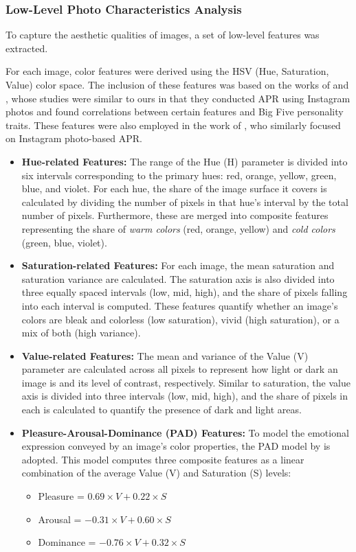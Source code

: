 \subsubsection{Low-Level Photo Characteristics Analysis}
To capture the aesthetic qualities of images, a set of low-level features was extracted.

For each image, color features were derived using the HSV (Hue, Saturation, Value) color space. The inclusion of these features was based on the works of \citet{ferwerda2016} and \citet{Ferwerda2018}, whose studies were similar to ours in that they conducted APR using Instagram photos and found correlations between certain features and Big Five personality traits. These features were also employed in the work of \citet{Branz2020}, who similarly focused on Instagram photo-based APR. 

\begin{itemize} 
	\item \textbf{Hue-related Features:} The range of the Hue (H) parameter is divided into six intervals corresponding to the primary hues: red, orange, yellow, green, blue, and violet. For each hue, the share of the image surface it covers is calculated by dividing the number of pixels in that hue's interval by the total number of pixels. Furthermore, these are merged into composite features representing the share of \textit{warm colors} (red, orange, yellow) and \textit{cold colors} (green, blue, violet). 
	\item \textbf{Saturation-related Features:} For each image, the mean saturation and saturation variance are calculated. The saturation axis is also divided into three equally spaced intervals (low, mid, high), and the share of pixels falling into each interval is computed. These features quantify whether an image's colors are bleak and colorless (low saturation), vivid (high saturation), or a mix of both (high variance). 
	\item \textbf{Value-related Features:} The mean and variance of the Value (V) parameter are calculated across all pixels to represent how light or dark an image is and its level of contrast, respectively. Similar to saturation, the value axis is divided into three intervals (low, mid, high), and the share of pixels in each is calculated to quantify the presence of dark and light areas. 
	\item \textbf{Pleasure-Arousal-Dominance (PAD) Features:} To model the emotional expression conveyed by an image's color properties, the PAD model by \citet{Valdez1994} is adopted. This model computes three composite features as a linear combination of the average Value (V) and Saturation (S) levels: 		
		\begin{itemize} 
			\item Pleasure = $0.69 \times V + 0.22 \times S$ 
			\item Arousal = $-0.31 \times V + 0.60 \times S$ 
			\item Dominance = $-0.76 \times V + 0.32 \times S$ 
		\end{itemize} 
\end{itemize} 

